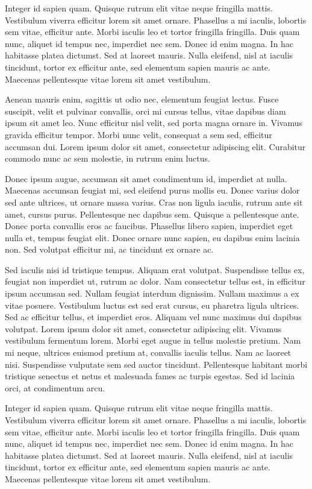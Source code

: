 \documentclass[12pt,a4paper,article]{memoir} %
\begin{document}
Integer id sapien quam. Quisque rutrum elit vitae neque fringilla mattis. Vestibulum viverra efficitur lorem sit amet ornare. Phasellus a mi iaculis, lobortis sem vitae, efficitur ante. Morbi iaculis leo et tortor fringilla fringilla. Duis quam nunc, aliquet id tempus nec, imperdiet nec sem. Donec id enim magna. In hac habitasse platea dictumst. Sed at laoreet mauris. Nulla eleifend, nisl at iaculis tincidunt, tortor ex efficitur ante, sed elementum sapien mauris ac ante. Maecenas pellentesque vitae lorem sit amet vestibulum.

Aenean mauris enim, sagittis ut odio nec, elementum feugiat lectus. Fusce suscipit, velit et pulvinar convallis, orci mi cursus tellus, vitae dapibus diam ipsum sit amet leo. Nunc efficitur nisl velit, sed porta magna ornare in. Vivamus gravida efficitur tempor. Morbi nunc velit, consequat a sem sed, efficitur accumsan dui. Lorem ipsum dolor sit amet, consectetur adipiscing elit. Curabitur commodo nunc ac sem molestie, in rutrum enim luctus.

Donec ipsum augue, accumsan sit amet condimentum id, imperdiet at nulla. Maecenas accumsan feugiat mi, sed eleifend purus mollis eu. Donec varius dolor sed ante ultrices, ut ornare massa varius. Cras non ligula iaculis, rutrum ante sit amet, cursus purus. Pellentesque nec dapibus sem. Quisque a pellentesque ante. Donec porta convallis eros ac faucibus. Phasellus libero sapien, imperdiet eget nulla et, tempus feugiat elit. Donec ornare nunc sapien, eu dapibus enim lacinia non. Sed volutpat efficitur mi, ac tincidunt ex ornare ac.

Sed iaculis nisi id tristique tempus. Aliquam erat volutpat. Suspendisse tellus ex, feugiat non imperdiet ut, rutrum ac dolor. Nam consectetur tellus est, in efficitur ipsum accumsan sed. Nullam feugiat interdum dignissim. Nullam maximus a ex vitae posuere. Vestibulum luctus est sed erat cursus, eu pharetra ligula ultrices. Sed ac efficitur tellus, et imperdiet eros. Aliquam vel nunc maximus dui dapibus volutpat.
\newpage
Lorem ipsum dolor sit amet, consectetur adipiscing elit. Vivamus vestibulum fermentum lorem. Morbi eget augue in tellus molestie pretium. Nam mi neque, ultrices euismod pretium at, convallis iaculis tellus. Nam ac laoreet nisi. Suspendisse vulputate sem sed auctor tincidunt. Pellentesque habitant morbi tristique senectus et netus et malesuada fames ac turpis egestas. Sed id lacinia orci, at condimentum arcu.

Integer id sapien quam. Quisque rutrum elit vitae neque fringilla mattis. Vestibulum viverra efficitur lorem sit amet ornare. Phasellus a mi iaculis, lobortis sem vitae, efficitur ante. Morbi iaculis leo et tortor fringilla fringilla. Duis quam nunc, aliquet id tempus nec, imperdiet nec sem. Donec id enim magna. In hac habitasse platea dictumst. Sed at laoreet mauris. Nulla eleifend, nisl at iaculis tincidunt, tortor ex efficitur ante, sed elementum sapien mauris ac ante. Maecenas pellentesque vitae lorem sit amet vestibulum.
\end{document}
